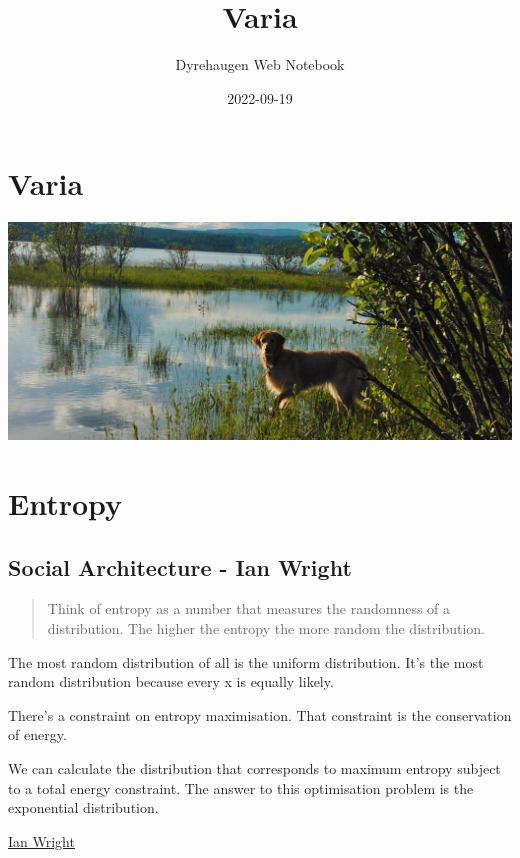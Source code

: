 \documentclass[
]{book}
\title{Varia}
\author{Dyrehaugen Web Notebook}
\date{2022-09-19}
\begin{document}
\maketitle

{
\setcounter{tocdepth}{1}
\tableofcontents
}
\hypertarget{varia}{%
\chapter{Varia}\label{varia}}

\includegraphics{fig/zelda.jpg}

\hypertarget{entropy}{%
\chapter{Entropy}\label{entropy}}

\hypertarget{social-architecture---ian-wright}{%
\section{Social Architecture - Ian Wright}\label{social-architecture---ian-wright}}

\begin{quote}
Think of entropy as a number that measures the randomness of a distribution.
The higher the entropy the more random the distribution.
\end{quote}

The most random distribution of all is the uniform distribution.
It's the most random distribution because every x is equally likely.

There's a constraint on entropy maximisation.
That constraint is the conservation of energy.

We can calculate the distribution that corresponds
to maximum entropy subject to a total energy constraint.
The answer to this optimisation problem is the exponential distribution.

\href{https://ianwrightsite.wordpress.com/2017/11/16/the-social-architecture-of-capitalism/}{Ian Wright}
\end{document}
